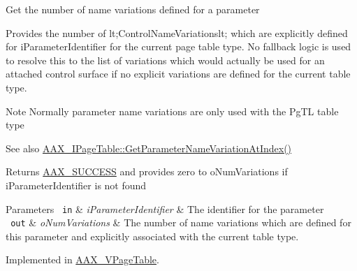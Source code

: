 Get the number of name variations defined for a parameter

Provides the number of {\ttfamily lt;Control\+Name\+Variationslt;} which are explicitly defined for {\ttfamily i\+Parameter\+Identifier} for the current page table type. No fallback logic is used to resolve this to the list of variations which would actually be used for an attached control surface if no explicit variations are defined for the current table type.

\begin{DoxyNote}{Note}
Normally parameter name variations are only used with the {\ttfamily \textquotesingle{}Pg\+TL\textquotesingle{}} table type
\end{DoxyNote}

\begin{DoxyItemize}
\item \begin{DoxySeeAlso}{See also}
\mbox{\hyperlink{a01849_adffe5a5f2ad548bd4c704508d816d568}{A\+A\+X\+\_\+\+I\+Page\+Table\+::\+Get\+Parameter\+Name\+Variation\+At\+Index()}}
\end{DoxySeeAlso}
\begin{DoxyReturn}{Returns}
\mbox{\hyperlink{a00494_a5f8c7439f3a706c4f8315a9609811937aeddbd1bb67e3a66e6af54a4b4a7a57b3}{A\+A\+X\+\_\+\+S\+U\+C\+C\+E\+SS}} and provides zero to {\ttfamily o\+Num\+Variations} if {\ttfamily i\+Parameter\+Identifier} is not found
\end{DoxyReturn}

\begin{DoxyParams}[1]{Parameters}
\mbox{\texttt{ in}}  & {\em i\+Parameter\+Identifier} & The identifier for the parameter \\
\hline
\mbox{\texttt{ out}}  & {\em o\+Num\+Variations} & The number of name variations which are defined for this parameter and explicitly associated with the current table type. \\
\hline
\end{DoxyParams}

\end{DoxyItemize}

Implemented in \mbox{\hyperlink{a01929_a07f92bc1f31bbab5156cac7ad0d35565}{A\+A\+X\+\_\+\+V\+Page\+Table}}.

\mbox{\label{a01849_adffe5a5f2ad548bd4c704508d816d568}} 
